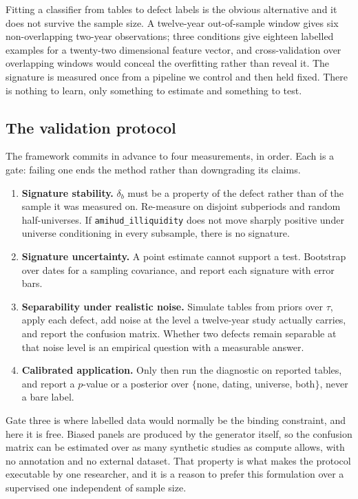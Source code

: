 \documentclass[11pt]{article}
\newcommand{\fac}[1]{\texttt{\small #1}}
\begin{document}
Fitting a classifier from tables to defect labels is the obvious alternative and it does
not survive the sample size. A twelve-year out-of-sample window gives six non-overlapping
two-year observations; three conditions give eighteen labelled examples for a
twenty-two dimensional feature vector, and cross-validation over overlapping windows would
conceal the overfitting rather than reveal it. The signature is measured once from a
pipeline we control and then held fixed. There is nothing to learn, only something to
estimate and something to test.

\subsection{The validation protocol}
\label{sec:protocol}

The framework commits in advance to four measurements, in order. Each is a gate: failing
one ends the method rather than downgrading its claims.

\begin{enumerate}
\item \textbf{Signature stability.} $\delta_b$ must be a property of the defect rather
than of the sample it was measured on. Re-measure on disjoint subperiods and random
half-universes. If \fac{amihud\_illiquidity} does not move sharply positive under universe
conditioning in every subsample, there is no signature.
\item \textbf{Signature uncertainty.} A point estimate cannot support a test. Bootstrap
over dates for a sampling covariance, and report each signature with error bars.
\item \textbf{Separability under realistic noise.} Simulate tables from priors over
$\tau$, apply each defect, add noise at the level a twelve-year study actually carries,
and report the confusion matrix. Whether two defects remain separable at that noise level
is an empirical question with a measurable answer.
\item \textbf{Calibrated application.} Only then run the diagnostic on reported tables,
and report a $p$-value or a posterior over $\{$none, dating, universe, both$\}$, never a
bare label.
\end{enumerate}

Gate three is where labelled data would normally be the binding constraint, and here it is
free. Biased panels are produced by the generator itself, so the confusion matrix can be
estimated over as many synthetic studies as compute allows, with no annotation and no
external dataset. That property is what makes the protocol executable by one researcher,
and it is a reason to prefer this formulation over a supervised one independent of sample
size.
\end{document}
